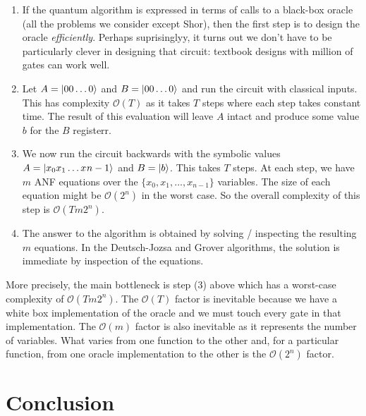 \documentclass[sigplan,review]{acmart}
\begin{document}
\begin{enumerate}
\item If the quantum algorithm is expressed in terms of calls to a
  black-box oracle (all the problems we consider except Shor), then
  the first step is to design the oracle \emph{efficiently}. Perhaps
  suprisinglyy, it turns out we don’t have to be particularly clever
  in designing that circuit: textbook designs with million of gates
  can work well. 
  \item Let $A = \ket{00\ldots 0}$ and $B = \ket{00\ldots 0}$ and run the
circuit with classical inputs. This has complexity $\mathcal{O}(T)$ as
it takes $T$ steps where each step takes constant time. The result of
this evaluation will leave $A$ intact and produce some value $b$ for
the $B$ registerr.
\item We now run the circuit backwards with the symbolic
values $A = \ket{x_0 x_1 \ldots x_{}n-1}$ and $B = \ket{b}$. This
takes $T$ steps. At each step, we have $m$ ANF equations over the
$\{x_0,x_1,\ldots,x_{n-1}\}$ variables. The size of each equation
  might be $\mathcal{O}(2^n)$ in the worst case. So the overall
  complexity of this step is $\mathcal{O}(Tm 2^n)$.
\item The answer to the algorithm is obtained by solving / inspecting
  the resulting $m$ equations. In the Deutsch-Jozsa and Grover
  algorithms, the solution is immediate by inspection of the
  equations.
\end{enumerate}
More precisely, the main bottleneck is step (3) above which has a
worst-case complexity of $\mathcal{O}(Tm 2^n)$. The $\mathcal{O}(T)$
factor is inevitable because we have a white box implementation of the
oracle and we must touch every gate in that implementation. The
$\mathcal{O}(m)$ factor is also inevitable as it represents the number
of variables. What varies from one function to the other and, for a
particular function, from one oracle implementation to the other is
the $\mathcal{O}(2^n)$ factor.

\section{Conclusion}
\end{document}
